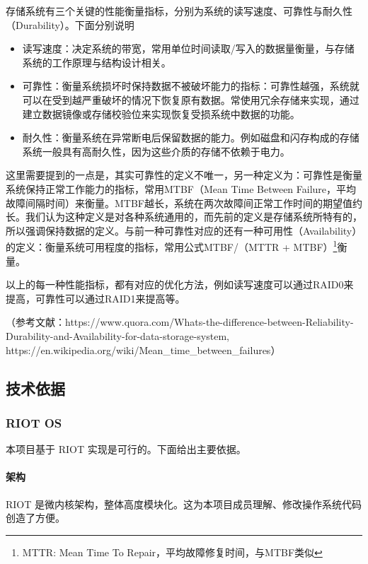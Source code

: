 \documentclass{ctexart}
\begin{document}
存储系统有三个关键的性能衡量指标，分别为系统的读写速度、可靠性与耐久性（Durability）。下面分别说明

\begin{itemize}
    \item 读写速度：决定系统的带宽，常用单位时间读取/写入的数据量衡量，与存储系统的工作原理与结构设计相关。
    \item 可靠性：衡量系统损坏时保持数据不被破坏能力的指标：可靠性越强，系统就可以在受到越严重破坏的情况下恢复原有数据。常使用冗余存储来实现，通过建立数据镜像或存储校验位来实现恢复受损系统中数据的功能。
    \item 耐久性：衡量系统在异常断电后保留数据的能力。例如磁盘和闪存构成的存储系统一般具有高耐久性，因为这些介质的存储不依赖于电力。
\end{itemize}

这里需要提到的一点是，其实可靠性的定义不唯一，另一种定义为：可靠性是衡量系统保持正常工作能力的指标，常用MTBF（Mean Time Between Failure，平均故障间隔时间）来衡量。MTBF越长，系统在两次故障间正常工作时间的期望值约长。我们认为这种定义是对各种系统通用的，而先前的定义是存储系统所特有的，所以强调保持数据的定义。与前一种可靠性对应的还有一种可用性（Availability）的定义：衡量系统可用程度的指标，常用公式MTBF/（MTTR + MTBF）\footnote{MTTR: Mean Time To Repair，平均故障修复时间，与MTBF类似}衡量。

以上的每一种性能指标，都有对应的优化方法，例如读写速度可以通过RAID0来提高，可靠性可以通过RAID1来提高等。

（参考文献：https://www.quora.com/Whats-the-difference-between-Reliability-Durability-and-Availability-for-data-storage-system, https://en.wikipedia.org/wiki/Mean_time_between_failures）

\subsection{技术依据}
\subsubsection{RIOT OS}
本项目基于 RIOT 实现是可行的。下面给出主要依据。

\paragraph{架构}
RIOT 是微内核架构，整体高度模块化。这为本项目成员理解、修改操作系统代码创造了方便。
\end{document}
